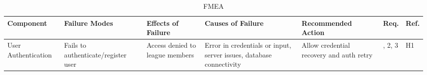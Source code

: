 \documentclass{article}
\begin{document}
\begin{landscape}
    \begin{table}[hp]
        \caption{FMEA} \label{FMEA}
        \centering
        \begin{footnotesize}
            \begin{tabular}{>{\raggedright\arraybackslash}p{1in}>{\raggedright\arraybackslash}p{1in}>{\raggedright\arraybackslash}p{1in}>{\raggedright\arraybackslash}p{1.5in}>{\raggedright\arraybackslash}p{2.5in}>{\centering\arraybackslash}p{0.2in}>{\centering\arraybackslash}p{0.2in}}
                \toprule
                \textbf{Component}        & \textbf{Failure Modes}                  & \textbf{Effects of Failure}                                                             & \textbf{Causes of Failure}                                       & \textbf{Recommended Action}                                                                                                                      & \textbf{Req.} & \textbf{Ref.} \\
                \midrule

                User Authentication       &
                Fails to authenticate/register user
                                          & Access denied to league members         & Error in credentials or input, server issues, database connectivity                     & Allow credential recovery and auth retry                         & 1, 2, 3                                                                                                                                          & H1                            \\
                \midrule


\end{tabular}
\end{footnotesize}
\end{table}
\end{landscape}
\end{document}
